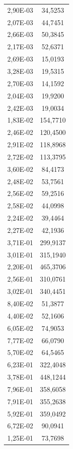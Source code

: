 \begin{figure}[h]
\begin{minipage}[c]{0.32\textwidth}
\begin{tabular}{|c|c|}
            2,90E-03 & 34,5253\\
            2,07E-03 & 44,7451\\
            2,66E-03 & 50,3845\\
            2,17E-03 & 52,6371\\
            2,69E-03 & 15,0193\\
            3,28E-03 & 19,5315\\
            2,70E-03 & 14,1592\\
            2,04E-03 & 19,9200\\
            2,42E-03 & 19,0034\\
            1,83E-02 & 154,7710\\
            2,46E-02 & 120,4500\\
            2,91E-02 & 118,8968\\
            2,72E-02 & 113,3795\\
            3,60E-02 & 84,4173\\
            2,48E-02 & 53,7561\\
            2,56E-02 & 59,2516\\
            2,58E-02 & 44,0998\\
            2,24E-02 & 39,4464\\
            2,27E-02 & 42,1936\\
            3,71E-01 & 299,9137\\
            3,01E-01 & 315,1940\\
            2,20E-01 & 465,3706\\
            2,56E-01 & 310,0761\\
            3,02E-01 & 340,4451\\
            8,40E-02 & 51,3877\\
            4,40E-02 & 52,1606\\
            6,05E-02 & 74,9053\\
            7,77E-02 & 66,0790\\
            5,70E-02 & 64,5465\\
            6,23E-01 & 322,4048\\
            3,78E-01 & 448,1244\\
            7,96E-01 & 358,6058\\
            7,91E-01 & 355,2638\\
            5,92E-01 & 359,0492\\
            6,72E-02 & 90,0941\\
            1,25E-01 & 73,7698\\

\end{tabular}
\end{minipage}
\end{figure}
